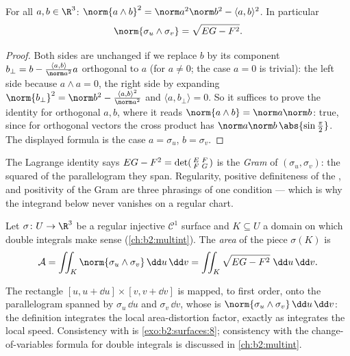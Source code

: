 \begin{lemma}\label{lem:b2:surfaces:lagrange}
For all $a, b \in \R^3$:
$\norm{a \wedge b}^2 = \norm a^2 \norm b^2 - \langle a, b\rangle^2$.
In particular
\[
\norm{\sigma_u \wedge \sigma_v} = \sqrt{EG - F^2}.
\]
\end{lemma}

\begin{proof}
Both sides are unchanged if we replace $b$ by its component $b_\perp
= b - \frac{\langle a, b\rangle}{\norm a^2}a$ orthogonal to $a$
(for $a \neq 0$; the case $a = 0$ is trivial): the left side
because $a \wedge a = 0$, the right side by expanding $\norm
{b_\perp}^2 = \norm b^2 - \frac{\langle a,b\rangle^2}{\norm a^2}$
and $\langle a, b_\perp\rangle = 0$. So it suffices to prove the
identity for orthogonal $a, b$, where it reads $\norm{a \wedge
b} = \norm a \norm b$: true, since for orthogonal vectors the
cross product has  $\norm a\norm b\,\abs{\sin\frac\pi2}$. The
displayed formula is the case $a = \sigma_u$, $b = \sigma_v$.
\end{proof}

\begin{remark}
The Lagrange identity says $EG - F^2 = \det\begin{psmallmatrix}
E & F\\ F & G\end{psmallmatrix}$ is the \emph{Gram
} of $(\sigma_u, \sigma_v)$: the squared  of
the parallelogram they span. Regularity, positive
definiteness of the , and positivity of
the Gram  are three phrasings of one condition ---
which is why the  integrand below never vanishes on a
regular chart.
\end{remark}

\begin{definition}[Area]\label{def:b2:surfaces:area}
Let $\sigma \colon U \to \R^3$ be a regular injective
$\mathcal{C}^1$ surface and $K \subseteq U$ a  domain on
which double integrals make sense (\cref{ch:b2:multint}). The
\emph{area} of the piece $\sigma(K)$ is
\[
\mathcal{A}
= \iint_K \norm{\sigma_u \wedge \sigma_v}\,\dd u\,\dd v
= \iint_K \sqrt{EG - F^2}\;\dd u\,\dd v .
\]
\end{definition}

\begin{remark}
The rectangle $[u, u + \dd u] \times [v, v + \dd v]$ is mapped, to
first order, onto the parallelogram spanned by $\sigma_u\,\dd u$
and $\sigma_v\,\dd v$, whose  is $\norm{\sigma_u \wedge
\sigma_v}\,\dd u\,\dd v$: the definition integrates the local
area-distortion factor, exactly as  integrates the local
speed. Consistency with  is
\cref{exo:b2:surfaces:8}; consistency with the change-of-variables
formula for double integrals is discussed in
\cref{ch:b2:multint}.
\end{remark}

